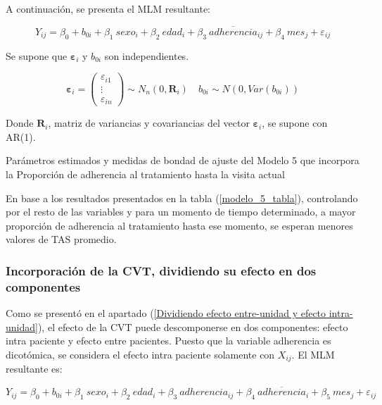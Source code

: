 \documentclass[spanish]{article}
\numberwithin{figure}{subsection}
\numberwithin{equation}{subsection}
\numberwithin{table}{subsection}
\begin{document}
A continuación, se presenta el MLM resultante:

\begin{equation}
	\label{modelo_5}
	Y_{ij} = \beta_0 + b_{0i} + \beta_1\ sexo_i + \beta_2\ edad_i + \beta_3\ \overline{adherencia}_{ij}
	+ \beta_4\ mes_j + \varepsilon_{ij}
\end{equation}

Se supone que $\bm{\varepsilon}_i$ y $b_{0i}$ son independientes.

\[ 
	\bm{\varepsilon}_i = \begin{pmatrix} \varepsilon_{i1} \\ \vdots \\ \varepsilon_{in} \end{pmatrix} \sim N_{n}(0, \bm{R}_i)
	\quad
	b_{0i} \sim N(0, Var(b_{0i}))
\]

Donde $\bm{R}_i$, matriz de variancias y covariancias del vector
$\bm{\varepsilon}_{i}$, se supone con AR(1).

\begin{table}[H]
	\centering
	\caption{Parámetros estimados y medidas de bondad de ajuste del Modelo 5 que incorpora la Proporción de adherencia al tratamiento hasta la visita actual}
	\label{modelo_5_tabla}
	
\end{table}

En base a los resultados presentados en la tabla (\ref{modelo_5_tabla}),
controlando por el resto de las variables y para un momento de tiempo
determinado, a mayor proporción de adherencia al tratamiento hasta ese momento,
se esperan menores valores de TAS promedio.

\subsubsection{Incorporación de la CVT, dividiendo su efecto en dos componentes}

Como se presentó en el apartado (\ref{Dividiendo efecto entre-unidad y efecto
intra-unidad}), el efecto de la CVT puede descomponerse en dos componentes:
efecto intra paciente y efecto entre pacientes. Puesto que la variable
adherencia es dicotómica, se considera el efecto intra paciente solamente con
$X_{ij}$. El MLM resultante es:

\begin{equation}
	\label{modelo_6}
	Y_{ij} = \beta_0 + b_{0i} + \beta_1\ sexo_i + \beta_2\ edad_i + \beta_3\ adherencia_{ij}
	+ \beta_4\ \overline{adherencia}_i + \beta_5\ mes_j + \varepsilon_{ij}
\end{equation}
\end{document}
